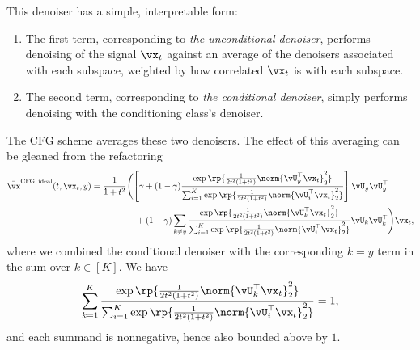 \documentclass[../../book-main.tex]{subfiles}
\begin{document}
\begin{example}
    This denoiser has a simple, interpretable form:
    \begin{enumerate}
        \item The first term, corresponding to \textit{the unconditional
            denoiser},
            performs denoising of the signal $\vx_t$ against an average of the
            denoisers associated with each subspace, weighted by how correlated
            $\vx_t$ is with each subspace.
        \item The second term, corresponding to \textit{the conditional
            denoiser}, simply performs denoising with the conditioning class's
            denoiser.
    \end{enumerate}

    The CFG scheme averages these two denoisers.
    The effect of this averaging can be gleaned from the refactoring
    \begin{equation}\label{eq:cfg-denoiser-mog-low-rank-2}
        \begin{split}
            \bar{\vx}^{\mathrm{CFG,\,ideal}}(t, \vx_t, y)
            =
            \frac{1}{1 + t^{2}}
            &\Biggl(
                \left[\gamma + (1 - \gamma)
                    \frac{\exp\rp{\frac{1}{2t^{2}(1
                    + t^{2})}\norm{\vU_{y}^{\top}\vx_t}_{2}^{2}}}{\sum_{i
                        = 1}^{K}\exp\rp{\frac{1}{2t^{2}(1
                    + t^{2})}\norm{\vU_{i}^{\top}\vx_t}_{2}^{2}}}
                \right]
                \vU_{y}\vU_{y}^{\top}
                \\
                &\quad+
                (1 - \gamma)
                \sum_{k \neq y}\frac{\exp\rp{\frac{1}{2t^{2}(1
                + t^{2})}\norm{\vU_{k}^{\top}\vx_t}_{2}^{2}}}{\sum_{i
                    = 1}^{K}\exp\rp{\frac{1}{2t^{2}(1
                                +
                t^{2})}\norm{\vU_{i}^{\top}\vx_t}_{2}^{2}}}\vU_{k}\vU_{k}^{\top}
            \Biggr)
            \vx_t,
        \end{split}
    \end{equation}
    where we combined the conditional denoiser with the corresponding $k=y$ term
    in the sum over $k \in [K]$.
    We have
    \begin{equation}
        \sum_{k=1}^K
        \frac{\exp\rp{\frac{1}{2t^{2}(1
        + t^{2})}\norm{\vU_{k}^{\top}\vx_t}_{2}^{2}}}{\sum_{i
            = 1}^{K}\exp\rp{\frac{1}{2t^{2}(1
        + t^{2})}\norm{\vU_{i}^{\top}\vx_t}_{2}^{2}}}
        = 1,
    \end{equation}
    and each summand is nonnegative, hence also bounded above by $1$.

\end{example}
\end{document}
